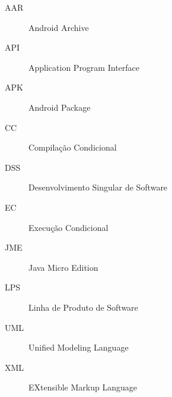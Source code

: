 
\begin{description}
  \item[AAR] Android Archive
  \item[API] Application Program Interface
  \item[APK] Android Package
  \item[CC]  Compilação Condicional
  \item[DSS] Desenvolvimento Singular de Software
  \item[EC]  Execução Condicional
  \item[JME] Java Micro Edition
  \item[LPS] Linha de Produto de Software
  \item[UML] Unified Modeling Language
  \item[XML] EXtensible Markup Language
\end{description}
